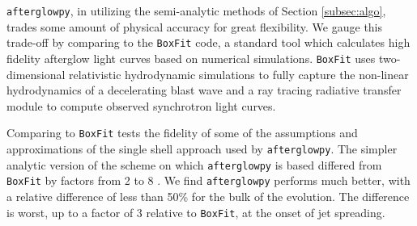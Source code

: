 \documentclass[twocolumn]{aastex62}
\newcommand{\afterglowpy}{{\tt afterglowpy}}
\newcommand{\boxfit}{{\tt BoxFit}}
\begin{document}
\afterglowpy{}, in utilizing the semi-analytic methods of Section \ref{subsec:algo}, trades some amount of physical accuracy for great flexibility.  We gauge this trade-off by comparing to the \boxfit{} code, a standard tool which calculates high fidelity afterglow light curves based on numerical simulations.  \boxfit{} uses two-dimensional relativistic hydrodynamic simulations to fully capture the non-linear hydrodynamics of a decelerating blast wave and a ray tracing radiative transfer module to compute observed synchrotron light curves.  

Comparing to \boxfit{} tests the fidelity of some of the assumptions and approximations of the single shell approach used by \afterglowpy{}.  The simpler analytic version of the scheme on which \afterglowpy{} is based differed from \boxfit{} by factors from 2 to 8 \citep{vanEerten:2010aa}.  We find \afterglowpy{} performs much better, with a relative difference of less than 50\% for the bulk of the evolution.  The difference is worst, up to a factor of 3 relative to \boxfit{}, at the onset of jet spreading.
\end{document}
